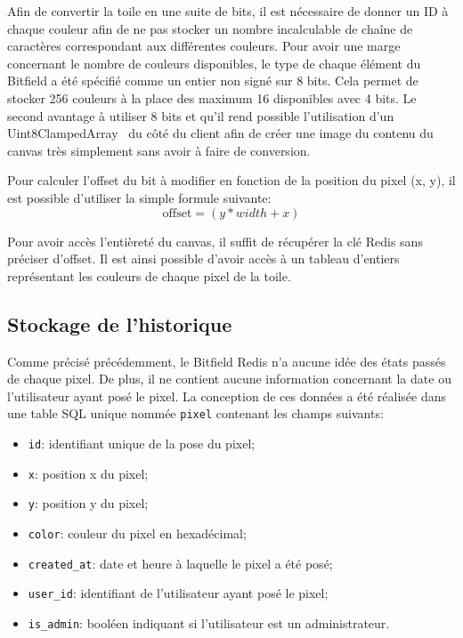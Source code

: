 Afin de convertir la toile en une suite de bits, il est nécessaire de donner un ID à chaque couleur afin de ne pas stocker un nombre incalculable de chaîne de caractères correspondant aux différentes couleurs. Pour avoir une marge concernant le nombre de couleurs disponibles, le type de chaque élément du Bitfield a été spécifié comme un entier non signé sur 8 bits. Cela permet de stocker 256 couleurs à la place des maximum 16 disponibles avec 4 bits. Le second avantage à utiliser 8 bits et qu'il rend possible l'utilisation d'un Uint8ClampedArray~\cite{uint8clampedarray} du côté du client afin de créer une image du contenu du canvas très simplement sans avoir à faire de conversion.

Pour calculer l'offset du bit à modifier en fonction de la position du pixel (x, y), il est possible d'utiliser la simple formule suivante:
\begin{equation}
  \mathrm{offset} = (y * width + x)
\end{equation}

Pour avoir accès l'entièreté du canvas, il suffit de récupérer la clé Redis sans préciser d'offset. Il est ainsi possible d'avoir accès à un tableau d'entiers représentant les couleurs de chaque pixel de la toile.

\subsection{Stockage de l'historique}

Comme précisé précédemment, le Bitfield Redis n'a aucune idée des états passés de chaque pixel. De plus, il ne contient aucune information concernant la date ou l'utilisateur ayant posé le pixel. La conception de ces données a été réalisée dans une table SQL unique nommée \texttt{pixel} contenant les champs suivants:

\begin{itemize}
  \item \texttt{id}: identifiant unique de la pose du pixel;
  \item \texttt{x}: position x du pixel;
  \item \texttt{y}: position y du pixel;
  \item \texttt{color}: couleur du pixel en hexadécimal;
  \item \texttt{created\_at}: date et heure à laquelle le pixel a été posé;
  \item \texttt{user\_id}: identifiant de l'utilisateur ayant posé le pixel;
  \item \texttt{is\_admin}: booléen indiquant si l'utilisateur est un administrateur.
\end{itemize}

